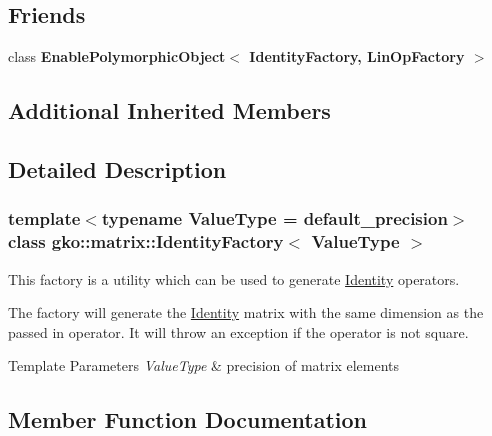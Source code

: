 \subsection*{Friends}
\begin{DoxyCompactItemize}
\item 
\mbox{\label{classgko_1_1matrix_1_1IdentityFactory_a36019ea4bb76c763866bd3b014e0fa4d}} 
class {\bfseries Enable\+Polymorphic\+Object$<$ Identity\+Factory, Lin\+Op\+Factory $>$}
\end{DoxyCompactItemize}
\subsection*{Additional Inherited Members}


\subsection{Detailed Description}
\subsubsection*{template$<$typename Value\+Type = default\+\_\+precision$>$\newline
class gko\+::matrix\+::\+Identity\+Factory$<$ Value\+Type $>$}

This factory is a utility which can be used to generate \hyperlink{classgko_1_1matrix_1_1Identity}{Identity} operators. 

The factory will generate the \hyperlink{classgko_1_1matrix_1_1Identity}{Identity} matrix with the same dimension as the passed in operator. It will throw an exception if the operator is not square.


\begin{DoxyTemplParams}{Template Parameters}
{\em Value\+Type} & precision of matrix elements \\
\hline
\end{DoxyTemplParams}


\subsection{Member Function Documentation}
\mbox{\label{classgko_1_1matrix_1_1IdentityFactory_a653ce1d7377e69643828b9c46b4d0319}} 
